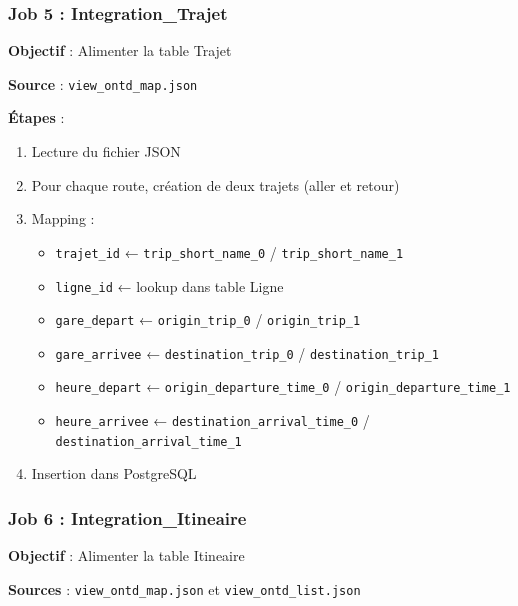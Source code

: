 \documentclass[12pt,a4paper]{article}
\begin{document}
\subsubsection{Job 5 : Integration\_Trajet}

\textbf{Objectif} : Alimenter la table Trajet

\textbf{Source} : \texttt{view\_ontd\_map.json}

\textbf{Étapes} :
\begin{enumerate}
    \item Lecture du fichier JSON
    \item Pour chaque route, création de deux trajets (aller et retour)
    \item Mapping :
        \begin{itemize}
            \item \texttt{trajet\_id} ← \texttt{trip\_short\_name\_0} / \texttt{trip\_short\_name\_1}
            \item \texttt{ligne\_id} ← lookup dans table Ligne
            \item \texttt{gare\_depart} ← \texttt{origin\_trip\_0} / \texttt{origin\_trip\_1}
            \item \texttt{gare\_arrivee} ← \texttt{destination\_trip\_0} / \texttt{destination\_trip\_1}
            \item \texttt{heure\_depart} ← \texttt{origin\_departure\_time\_0} / \texttt{origin\_departure\_time\_1}
            \item \texttt{heure\_arrivee} ← \texttt{destination\_arrival\_time\_0} / \texttt{destination\_arrival\_time\_1}
        \end{itemize}
    \item Insertion dans PostgreSQL
\end{enumerate}

\subsubsection{Job 6 : Integration\_Itineaire}

\textbf{Objectif} : Alimenter la table Itineaire

\textbf{Sources} : \texttt{view\_ontd\_map.json} et \texttt{view\_ontd\_list.json}
\end{document}
